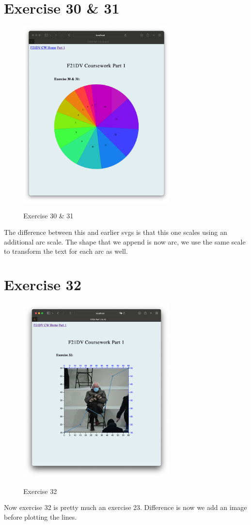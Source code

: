 \documentclass{scrreprt}
\begin{document}
\section{Exercise 30 \& 31}
\begin{figure}[!ht]
    \centering
    \includegraphics[width = 8cm]{images/ex30.png}
    \label{fig:ex30}
    \caption{Exercise 30 \& 31}
\end{figure}
\FloatBarrier

The difference between this and earlier svgs is that this one scales using an additional arc scale.
The shape that we append is now arc, we use the same scale to transform the text for each arc as well.

\newpage
\section{Exercise 32}
\begin{figure}[!ht]
    \centering
    \includegraphics[width = 8cm]{images/ex32.png}
    \label{fig:ex32}
    \caption{Exercise 32}
\end{figure}
\FloatBarrier

Now exercise 32 is pretty much an exercise 23. Difference is now we add an image before plotting the lines.
\end{document}

